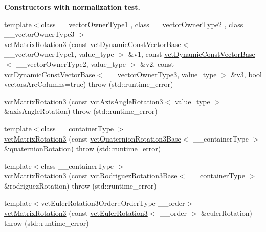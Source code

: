\begin{Indent}{\bf Constructors with normalization test.}
\begin{DoxyCompactItemize}
\item 
{\footnotesize template$<$class \+\_\+\+\_\+vector\+Owner\+Type1 , class \+\_\+\+\_\+vector\+Owner\+Type2 , class \+\_\+\+\_\+vector\+Owner\+Type3 $>$ }\\\hyperlink{classvct_matrix_rotation3_a6d625e7a17ae6b79be631213d6aa0812}{vct\+Matrix\+Rotation3} (const \hyperlink{classvct_dynamic_const_vector_base}{vct\+Dynamic\+Const\+Vector\+Base}$<$ \+\_\+\+\_\+vector\+Owner\+Type1, value\+\_\+type $>$ \&v1, const \hyperlink{classvct_dynamic_const_vector_base}{vct\+Dynamic\+Const\+Vector\+Base}$<$ \+\_\+\+\_\+vector\+Owner\+Type2, value\+\_\+type $>$ \&v2, const \hyperlink{classvct_dynamic_const_vector_base}{vct\+Dynamic\+Const\+Vector\+Base}$<$ \+\_\+\+\_\+vector\+Owner\+Type3, value\+\_\+type $>$ \&v3, bool vectors\+Are\+Columns=true)  throw (std\+::runtime\+\_\+error)
\item 
\hyperlink{classvct_matrix_rotation3_a366fafccaffa4bb36e6ecfe9c25dd522}{vct\+Matrix\+Rotation3} (const \hyperlink{classvct_axis_angle_rotation3}{vct\+Axis\+Angle\+Rotation3}$<$ value\+\_\+type $>$ \&axis\+Angle\+Rotation)  throw (std\+::runtime\+\_\+error)
\item 
{\footnotesize template$<$class \+\_\+\+\_\+container\+Type $>$ }\\\hyperlink{classvct_matrix_rotation3_a1c3c3d30e8b0e5b90ebafe79c0aa999a}{vct\+Matrix\+Rotation3} (const \hyperlink{classvct_quaternion_rotation3_base}{vct\+Quaternion\+Rotation3\+Base}$<$ \+\_\+\+\_\+container\+Type $>$ \&quaternion\+Rotation)  throw (std\+::runtime\+\_\+error)
\item 
{\footnotesize template$<$class \+\_\+\+\_\+container\+Type $>$ }\\\hyperlink{classvct_matrix_rotation3_ad3ee676918da52986315687ca042f2aa}{vct\+Matrix\+Rotation3} (const \hyperlink{classvct_rodriguez_rotation3_base}{vct\+Rodriguez\+Rotation3\+Base}$<$ \+\_\+\+\_\+container\+Type $>$ \&rodriguez\+Rotation)  throw (std\+::runtime\+\_\+error)
\item 
{\footnotesize template$<$vct\+Euler\+Rotation3\+Order\+::\+Order\+Type \+\_\+\+\_\+order$>$ }\\\hyperlink{classvct_matrix_rotation3_a1ee6bac2e38b1b51521bac5fac8d6fd2}{vct\+Matrix\+Rotation3} (const \hyperlink{classvct_euler_rotation3}{vct\+Euler\+Rotation3}$<$ \+\_\+\+\_\+order $>$ \&euler\+Rotation)  throw (std\+::runtime\+\_\+error)
\end{DoxyCompactItemize}
\end{Indent}
